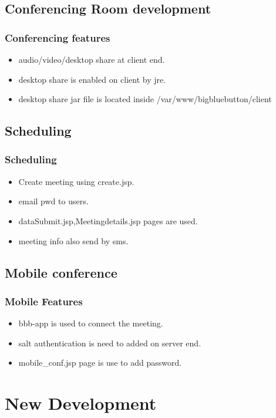 \documentclass{beamer}
\begin{document}
\subsection{Conferencing Room development}
\begin{frame}
\frametitle{Conferencing features}
\begin{itemize}

\item audio/video/desktop share at client end.\pause
\item desktop share is enabled on client by jre.\pause
\item desktop share jar file is located inside /var/www/bigbluebutton/client
\end{itemize}
\end{frame}

\subsection{Scheduling}
\begin{frame}
\frametitle{Scheduling}
\begin{itemize}

\item Create meeting using create.jsp.\pause 
\item email pwd to users.\pause
\item dataSubmit.jsp,Meetingdetails.jsp pages are used.\pause
\item meeting info also send by sms.

\end{itemize}
\end{frame}


\subsection{Mobile conference}
\begin{frame}
\frametitle{Mobile Features}
\begin{itemize}
\item bbb-app is used to connect the meeting.\pause
\item salt authentication is need to added on server end.\pause
\item mobile\_conf.jsp page is use to add password.
\end{itemize}
\end{frame}
\section{New Development}
\end{document}
